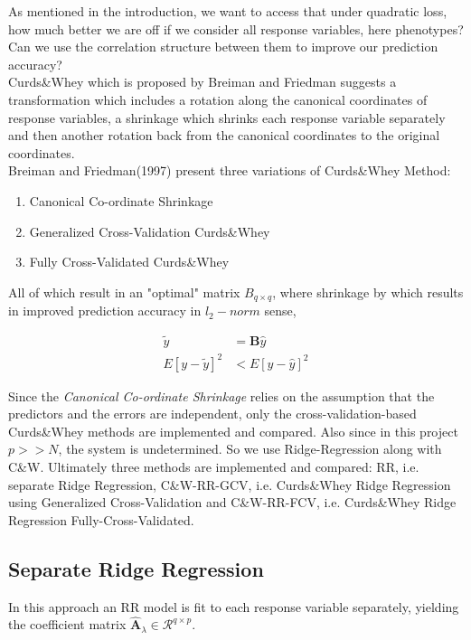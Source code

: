 \documentclass[a4paper]{article}
\begin{document}
As mentioned in the introduction, we want to access that under quadratic loss, how much better we are off if we consider all response variables, here phenotypes? Can we use the correlation structure between them to improve our prediction accuracy?\\
Curds\&Whey which is proposed by Breiman and Friedman\cite{breiman} suggests a transformation which includes a rotation along the canonical coordinates of response variables, a shrinkage which shrinks each response variable separately and then another rotation back from the canonical coordinates to the original coordinates.\\
Breiman and Friedman(1997)\cite{breiman} present three variations of Curds\&Whey Method:
\begin{enumerate}
\item Canonical Co-ordinate Shrinkage
\item Generalized Cross-Validation Curds\&Whey
\item Fully Cross-Validated Curds\&Whey
\end{enumerate}

All of which result in an "optimal" matrix $B_{q \times q}$, where shrinkage by which results in improved prediction accuracy in $l_2-norm$ sense,

\begin{equation}
\begin{split}
\tilde{y} &= \mathbf{B}\hat{y}\\
E[y - \tilde{y}]^2 &< E[y - \hat{y}]^2
\end{split}
\end{equation}

Since the \textit{Canonical Co-ordinate Shrinkage} relies on the assumption that the predictors and the errors are independent, only the cross-validation-based Curds\&Whey methods are implemented and compared. Also since in this project $p>>N$, the system is undetermined. So we use Ridge-Regression along with C\&W. Ultimately three methods are implemented and compared: RR, i.e. separate Ridge Regression, C\&W-RR-GCV, i.e. Curds\&Whey Ridge Regression using Generalized Cross-Validation and C\&W-RR-FCV, i.e. Curds\&Whey Ridge Regression Fully-Cross-Validated.

\subsection{Separate Ridge Regression}
In this approach an RR model is fit to each response variable separately, yielding the coefficient matrix $\hat{\mathbf{A}}_{\lambda} \in \mathcal{R}^{q \times p}$.
\end{document}

